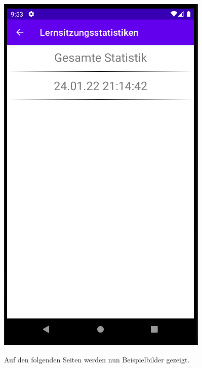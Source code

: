 \documentclass[ngerman]{tutorial}
\begin{document}
\begin{center}
    \includegraphics[scale=0.45]{stats_selectionLearn.png}
\end{center}
Auf den folgenden Seiten werden nun Beispielbilder gezeigt.
\end{document}
